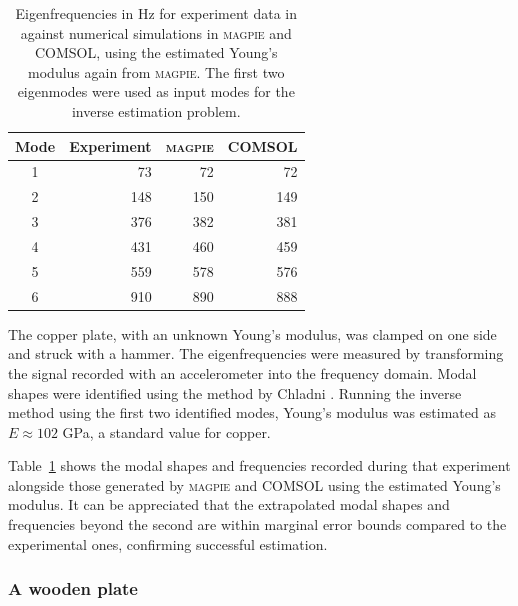 \begin{table}
	\centering
	\begin{tabular}{c r r r}
		\toprule
		Mode          & \textbf{Experiment} & \textbf{\textsc{magpie}} & \textbf{COMSOL} \\ \hline
		1 \chladniOne & 73                  & 72               & 72                \\
		2 \chladniTwo & 148                 & 150              & 149               \\
        \hline
		3 \chladniThr & 376                 & 382              & 381               \\
		4 \chladniFou & 431                 & 460              & 459               \\
		5 \chladniFiv & 559                 & 578              & 576               \\
		6 \chladniSix & 910                 & 890              & 888               \\ 
        \bottomrule
	\end{tabular}
	\caption[Eigenfrequencies of experimental data]{Eigenfrequencies in Hz for experiment data in \textcite{duran_experimentally_2023} against numerical simulations in \textsc{magpie} and COMSOL, using the estimated Young's modulus again from \textsc{magpie}. The first two eigenmodes were used as input modes for the inverse estimation problem.}
	\label{tab:case-study}
\end{table}

The copper plate, with an unknown Young's modulus, was clamped on one side and struck with a hammer. The eigenfrequencies were measured by transforming the signal recorded with an accelerometer into the frequency domain. Modal shapes were identified using the method by Chladni \cite{chladni_treatise_2015}. Running the inverse method using the first two identified modes, Young's modulus was estimated as $E\approx 102$ GPa, a standard value for copper.  


Table~\ref{tab:case-study} shows the modal shapes and frequencies recorded during that experiment alongside those generated by \textsc{magpie} and COMSOL using the estimated Young's modulus. It can be appreciated that the extrapolated modal shapes and frequencies beyond the second are within marginal error bounds compared to the experimental ones, confirming successful estimation. 


\subsubsection{A wooden plate}

